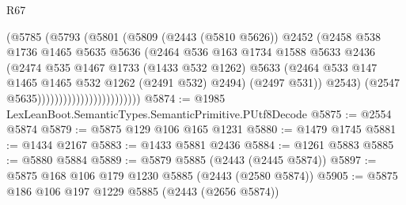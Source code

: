 \begin{lexlean}{R67}
\begin{coremodule}
                                        (@5785
                                          (@5793
                                            (@5801
                                              (@5809
                                                (@2443 (@5810 @5626))
                                                @2452
                                                (@2458
                                                  @538
                                                  @1736
                                                  @1465
                                                  @5635
                                                  @5636
                                                  (@2464
                                                    @536
                                                    @163
                                                    @1734
                                                    @1588
                                                    @5633
                                                    @2436
                                                    (@2474
                                                      @535
                                                      @1467
                                                      @1733
                                                      (@1433 @532 @1262)
                                                      @5633
                                                      (@2464
                                                        @533
                                                        @147
                                                        @1465
                                                        @1465
                                                        @532
                                                        @1262
                                                        (@2491 @532)
                                                        @2494)
                                                      (@2497 @531))
                                                    @2543)
                                                  (@2547 @5635))))))))))))))))))))))))
@5874 := @1985 LexLeanBoot.SemanticTypes.SemanticPrimitive.PUtf8Decode
@5875 := @2554 @5874
@5879 := @5875 @129 @106 @165 @1231
@5880 := @1479 @1745
@5881 := @1434 @2167
@5883 := @1433 @5881 @2436
@5884 := @1261 @5883
@5885 := @5880 @5884
@5889 := @5879 @5885 (@2443 (@2445 @5874))
@5897 := @5875 @168 @106 @179 @1230 @5885 (@2443 (@2580 @5874))
@5905 := @5875 @186 @106 @197 @1229 @5885 (@2443 (@2656 @5874))

\end{coremodule}
\end{lexlean}
